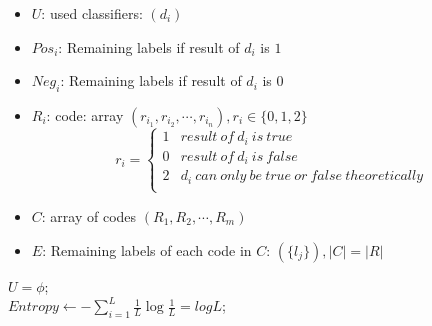 \documentclass{article}
\begin{document}

\begin{itemize}
\item $U$: used classifiers: $(d_{i})$


\item $Pos_i$: Remaining labels if result of $d_i$ is $1$
\item $Neg_i$: Remaining labels if result of $d_i$ is $0$
\item $R_i$: code: array $(r_{i_1},r_{i_2},\cdots,r_{i_{n}}),r_i\in\{0,1,2\}$
$$
r_i=\left\{
\begin{array}{cc}
1 & result\ of\ d_i\ is\ true\\
0 & result\ of\ d_i\ is\ false\\
2 & d_i\ can\ only\ be\ true\ or\ false\ theoretically\\
\end{array}
\right.
$$
\item $C$: array of codes $(R_1,R_2,\cdots,R_m)$
\item $E$: Remaining labels of each code in $C$: $(\{l_j\}),|C|=|R|$

\end{itemize}

\begin{algorithm}
\caption{}
$U=\phi$;\\
$Entropy\leftarrow -\sum_{i=1}^{L}\frac{1}{L}\log\frac{1}{L}=logL$;\\

\end{algorithm}
\end{document}
